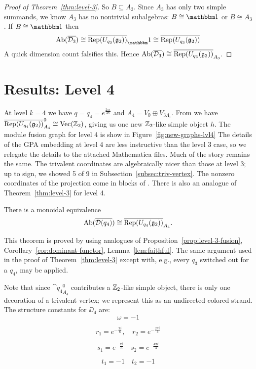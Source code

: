 \begin{proof}[Proof of Theorem~\ref{thm:level-3}]
    So $B\subseteq A_3$. Since $A_3$ has only two simple summands, we know $A_3$ has no nontrivial subalgebras: $B\cong \unit$ or $B\cong A_3$.
    If $B\cong \unit$ then
    \[
        \Ab(\ol{\DD_3}) \cong \ol{\Rep(U_{q_3}(\gg_2))}_\unit \cong \ol{\Rep(U_{q_3}(\gg_2))}
    \]
    A quick dimension count falsifies this. Hence $\operatorname{Ab}(\overline{\mathcal{D}_3}) \cong \overline{ \operatorname{Rep}(U_{q_3}(\mathfrak{g}_2))}_{A_3}$.
\end{proof}








\section{Results: Level 4}\label{sec:results-4}
At level $k=4$ we have $q = q_4 = e^{\frac{2\pi i}{48}}$ and 
$A_4=V_\emptyset \oplus V_{3\Lambda_1}$. 
From \cite{DMNO} we have $\overline{\operatorname{Rep}(U_{q_4}(\mathfrak{g}_2))}_{A_4}^0 \cong \operatorname{Vec}(\mathbb{Z}_2)$, giving us one new 
$\mathbb{Z}_2$-like simple object $h$. 
The module fusion graph for level 4 is show in Figure~\ref{fig:new-graphs-lvl4}
The details of the GPA embedding at level 4 are less instructive than the level 3 case, 
so we relegate the details to the attached Mathematica files. 
Much of the story remains the same. 
The trivalent coordinates are algebraically nicer than those at level 3; 
up to sign, we showed 5 of 9 in Subsection~\ref{subsec:triv-vertex}. 
The nonzero coordinates of the projection come in blocks of . 
There is also an analogue of Theorem~\ref{thm:level-3} for level 4.

\begin{theorem}\label{thm:level-4}
    There is a monoidal equivalence
    \[
        \operatorname{Ab}(\overline{\mathcal{D}(q_4)}) \cong \overline{ \operatorname{Rep}(U_{q_4}(\mathfrak{g}_2))}_{A_4}.
    \]
\end{theorem}

This theorem is proved by using analogues of Proposition~\ref{prop:level-3-fusion}, Corollary~\ref{cor:dominant-functor}, Lemma~\ref{lem:faithful}.
The same argument used in the proof of Theorem~\ref{thm:level-3} except with, e.g., every $q_3$ switched out for a $q_4$, may be applied.

Note that since $\cat{q_4}_{A_4}^0$ contributes a $\mathbb{Z}_2$-like simple object, there is only one decoration of a trivalent vertex;
we represent this as an undirected colored strand.
The structure constants for $\DD_4$ are:
\begin{equation*}
    \omega = -1
\end{equation*}

\begin{equation*}
    r_1 = e^{-\frac{\pi i}{6}}, \quad r_2 = e^{-\frac{2\pi i}{3}}
\end{equation*}

\begin{equation*}
    s_1 = e^{-\frac{\pi i}{6}} \quad s_2 = e^{-\frac{4\pi i}{3}}
\end{equation*}

\begin{equation*}
    t_1 = -1 \quad t_2 = -1
\end{equation*}

